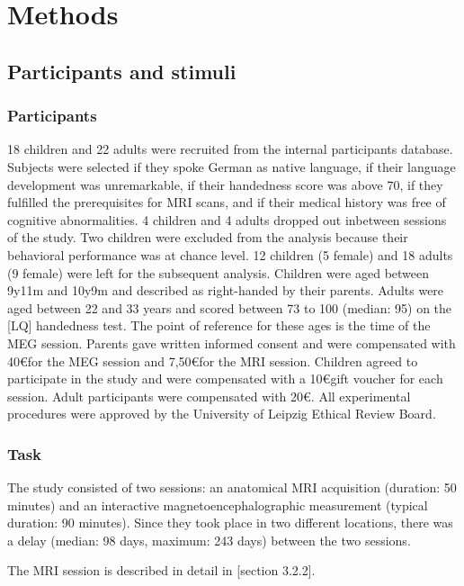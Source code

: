 \chapter{Methods}\label{methods}

\section {Participants and stimuli}

\subsection{Participants}

18 children and 22 adults were recruited from the internal participants database.
Subjects were selected if they spoke German as native language, if their language development was unremarkable, if their handedness score was above 70, if they fulfilled the prerequisites for MRI scans, and if their medical history was free of cognitive abnormalities.
4 children and 4 adults dropped out inbetween sessions of the study.
Two children were excluded from the analysis because their behavioral performance was at chance level.
12 children (5 female) and 18 adults (9 female) were left for the subsequent analysis.
Children were aged between 9y11m and 10y9m and described as right-handed by their parents.
Adults were aged between 22 and 33 years and scored between 73 to 100 (median: 95) on the [LQ] handedness test. 
The point of reference for these ages is the time of the MEG session.
Parents gave written informed consent and were compensated with 40\euro for the MEG session and 7,50\euro for the MRI session.
Children agreed to participate in the study and were compensated with a 10\euro gift voucher for each session.
Adult participants were compensated with 20\euro.
All experimental procedures were approved by the University of Leipzig Ethical Review Board.


\subsection{Task}

The study consisted of two sessions: an anatomical MRI acquisition (duration: 50 minutes) and an interactive magnetoencephalographic measurement (typical duration: 90 minutes).
Since they took place in two different locations, there was a delay (median: 98 days, maximum: 243 days) between the two sessions.

The MRI session is described in detail in [section 3.2.2].

